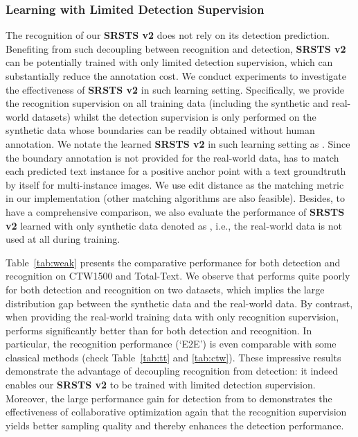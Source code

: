 \subsubsection{Learning with Limited Detection Supervision}
The recognition of our \textbf{SRSTS v2} does not rely on its detection prediction. Benefiting from such decoupling between recognition and detection, \textbf{SRSTS v2} can be potentially trained with only limited detection supervision, which can substantially reduce the annotation cost.
We conduct experiments to investigate the effectiveness of \textbf{SRSTS v2} in such learning setting. Specifically, we provide the recognition supervision on all training data (including the synthetic and real-world datasets) whilst the detection supervision is only performed on the synthetic data whose boundaries can be readily obtained without human annotation. We notate the learned \textbf{SRSTS v2} in such learning setting as . Since the boundary annotation is not provided for the real-world data,  has to match each predicted text instance for a positive anchor point with a text groundtruth by itself for multi-instance images. We use edit distance as the matching metric in our implementation (other matching algorithms are also feasible). Besides, to have a comprehensive comparison, we also evaluate the performance of \textbf{SRSTS v2} learned with only synthetic data denoted as , i.e., the real-world data is not used at all during training.

Table~\ref{tab:weak} presents the comparative performance for both detection and recognition on CTW1500 and Total-Text. We observe that  performs quite poorly for both detection and recognition on two datasets, which implies the large distribution gap between the synthetic data and the real-world data. By contrast, when providing the real-world training data with only recognition supervision,  performs significantly better than  for both detection and recognition. In particular, the recognition performance (`E2E') is even comparable with some classical methods (check Table~\ref{tab:tt} and \ref{tab:ctw}). These impressive results demonstrate the advantage of decoupling recognition from detection: it indeed enables our \textbf{SRSTS v2} to be trained with limited detection supervision. Moreover, the large performance gain for detection from  to  demonstrates the effectiveness of collaborative optimization again that the recognition supervision yields better sampling quality and thereby enhances the detection performance.

